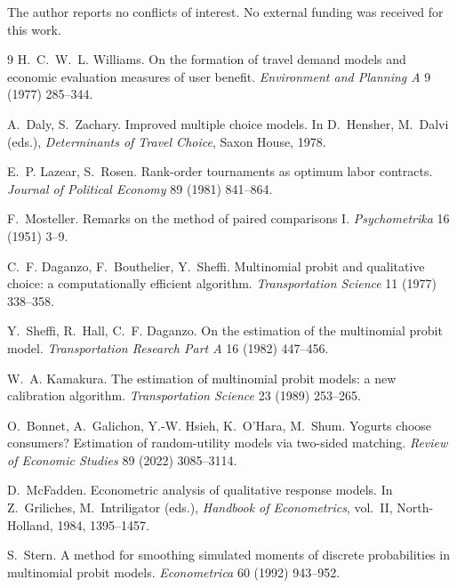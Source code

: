 \documentclass[12pt]{article}
\theoremstyle{remark}
\begin{document}
The author reports no conflicts of interest. No external funding was
received for this work.

\begin{thebibliography}{9}
 H.~C.~W.~L. Williams. On the
formation of travel demand models and economic evaluation measures of
user benefit. \emph{Environment and Planning A} 9 (1977) 285--344.

 A.~Daly, S.~Zachary.
Improved multiple choice models. In D.~Hensher, M.~Dalvi (eds.),
\emph{Determinants of Travel Choice}, Saxon House, 1978.

 E.~P. Lazear, S.~Rosen.
Rank-order tournaments as optimum labor contracts. \emph{Journal of
Political Economy} 89 (1981) 841--864.

 F.~Mosteller. Remarks on the
method of paired comparisons I. \emph{Psychometrika} 16 (1951) 3--9.

 C.~F. Daganzo, F.~Bouthelier, Y.~Sheffi.
Multinomial probit and qualitative choice: a computationally efficient
algorithm. \emph{Transportation Science} 11 (1977) 338--358.

Y.~Sheffi, R.~Hall, C.~F. Daganzo. On the estimation of the multinomial
probit model. \emph{Transportation Research Part A} 16 (1982) 447--456.

 W.~A. Kamakura. The estimation
of multinomial probit models: a new calibration algorithm.
\emph{Transportation Science} 23 (1989) 253--265.

 O.~Bonnet, A.~Galichon, Y.-W. Hsieh, K.~O'Hara,
M.~Shum. Yogurts choose consumers? Estimation of random-utility models
via two-sided matching. \emph{Review of Economic Studies} 89 (2022)
3085--3114.

 D.~McFadden. Econometric
analysis of qualitative response models. In Z.~Griliches,
M.~Intriligator (eds.), \emph{Handbook of Econometrics}, vol.~II,
North-Holland, 1984, 1395--1457.

 S.~Stern. A method for smoothing
simulated moments of discrete probabilities in multinomial probit
models. \emph{Econometrica} 60 (1992) 943--952.


\end{thebibliography}
\end{document}

